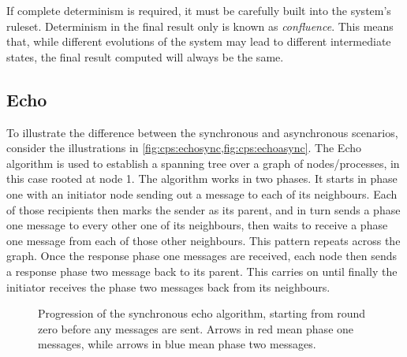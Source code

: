 If complete determinism is required, it must be carefully built into the system's ruleset.  Determinism in the final result only is known as \emph{confluence}.  This means that, while different evolutions of the system may lead to different intermediate states, the final result computed will always be the same.

\subsection{Echo}
To illustrate the difference between the synchronous and asynchronous scenarios, consider the illustrations in \cref{fig:cps:echosync,fig:cps:echoasync}.  The Echo algorithm \cite[Ch.~4.3]{Fokkink2013} is used to establish a spanning tree over a graph of nodes/processes, in this case rooted at node 1.  The algorithm works in two phases.  It starts in phase one with an initiator node sending out a message to each of its neighbours.  Each of those recipients then marks the sender as its parent, and in turn sends a phase one message to every other one of its neighbours, then waits to receive a phase one message from each of those other neighbours.  This pattern repeats across the graph.  Once the response phase one messages are received, each node then sends a response phase two message back to its parent.  This carries on until finally the initiator receives the phase two messages back from its neighbours.

\begin{figure}[htbp]
    \centering
    \caption{Progression of the synchronous echo algorithm, starting from round zero before any messages are sent.  Arrows in red mean phase one messages, while arrows in blue mean phase two messages.}
    \label{fig:cps:echosync}
\end{figure}

